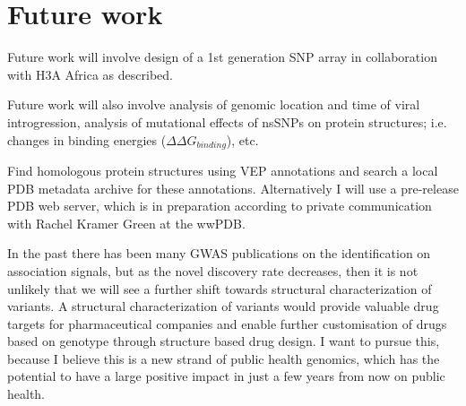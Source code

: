 \chapter{Future work}
\label{chap:future}

Future work will involve design of a 1st generation SNP array in collaboration with H3A Africa as described.

Future work will also involve analysis of genomic location and time of viral introgression, analysis of mutational effects of nsSNPs on protein structures; i.e. changes in binding energies ($\Delta \Delta G_{binding}$), etc.

Find homologous protein structures using \gls{VEP} annotations and search a local \gls{PDB} metadata archive for these annotations. Alternatively I will use a pre-release \gls{PDB} web server, which is in preparation according to private communication with Rachel Kramer Green at the \gls{wwPDB}.

In the past there has been many \gls{GWAS} publications on the identification on association signals, but as the novel discovery rate decreases, then it is not unlikely that we will see a further shift towards structural characterization of variants.\cite{Teng2009}\cite{Kucukkal201518} A structural characterization of variants would provide valuable drug targets for pharmaceutical companies and enable further customisation of drugs based on genotype through structure based drug design.\cite{Kuntz21081992} I want to pursue this, because I believe this is a new strand of public health genomics, which has the potential to have a large positive impact in just a few years from now on public health.